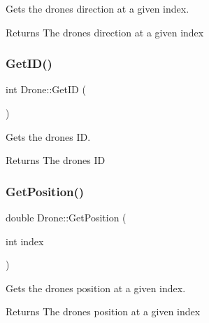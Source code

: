 Gets the drone\textquotesingle{}s direction at a given index. 

\begin{DoxyReturn}{Returns}
The drone\textquotesingle{}s direction at a given index 
\end{DoxyReturn}
\mbox{\label{classDrone_a5e69f5ebe80ece53ccb2238a2b598d97}} 
\subsubsection{\texorpdfstring{Get\+I\+D()}{GetID()}}
{\footnotesize\ttfamily int Drone\+::\+Get\+ID (\begin{DoxyParamCaption}{ }\end{DoxyParamCaption})\hspace{0.3cm}{\ttfamily [inline]}}



Gets the drone\textquotesingle{}s ID. 

\begin{DoxyReturn}{Returns}
The drone\textquotesingle{}s ID 
\end{DoxyReturn}
\mbox{\label{classDrone_ad8e2a72eb608ef4f8a82402a74fd5ad5}} 
\subsubsection{\texorpdfstring{Get\+Position()}{GetPosition()}}
{\footnotesize\ttfamily double Drone\+::\+Get\+Position (\begin{DoxyParamCaption}\item[{int}]{index }\end{DoxyParamCaption})\hspace{0.3cm}{\ttfamily [inline]}}



Gets the drone\textquotesingle{}s position at a given index. 

\begin{DoxyReturn}{Returns}
The drone\textquotesingle{}s position at a given index 
\end{DoxyReturn}
\mbox{\label{classDrone_ac8c535643f2be526c0ac8b0cc1fc49fc}} 
